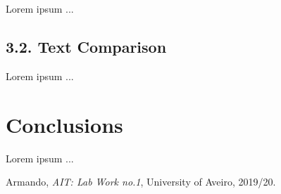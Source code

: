 \documentclass[12pt]{article}
\begin{document}
Lorem ipsum ...

\subsection*{3.2. Text Comparison}

Lorem ipsum ...

\section*{Conclusions}

Lorem ipsum ...

\begin{thebibliography}{9}
  

    Armando,
    \textit{AIT: Lab Work no.1},
    University of Aveiro,
    2019/20.
  
\end{thebibliography}






\end{document}
